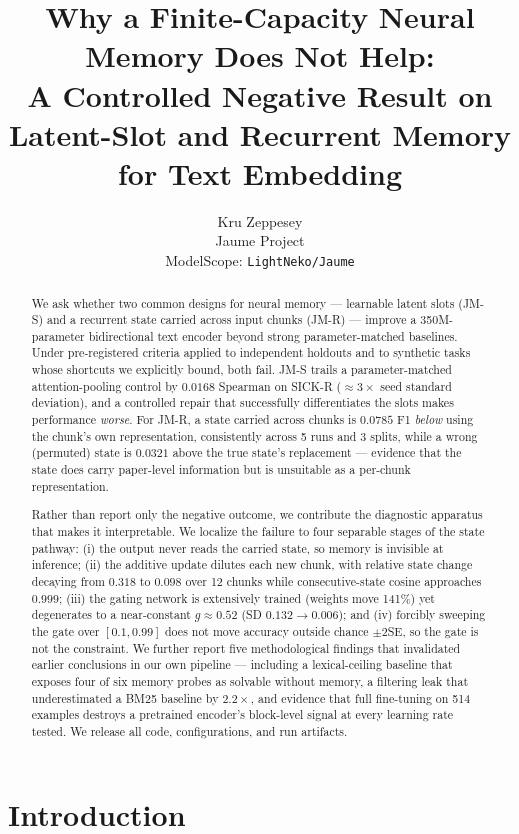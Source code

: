 \documentclass[10pt,twocolumn,letterpaper]{article}
\title{\vspace{-1.2em}Why a Finite-Capacity Neural Memory Does Not Help:\\
A Controlled Negative Result on Latent-Slot and Recurrent Memory\\for Text Embedding}
\author{Kru Zeppesey\\\small Jaume Project\\\small ModelScope: \texttt{LightNeko/Jaume}}
\date{}
\begin{document}
\maketitle

\begin{abstract}
We ask whether two common designs for neural memory --- learnable latent slots
(JM-S) and a recurrent state carried across input chunks (JM-R) --- improve a
350M-parameter bidirectional text encoder beyond strong parameter-matched
baselines. Under pre-registered criteria applied to independent holdouts and to
synthetic tasks whose shortcuts we explicitly bound, both fail. JM-S trails a
parameter-matched attention-pooling control by $0.0168$ Spearman on SICK-R
($\approx\!3\times$ seed standard deviation), and a controlled repair that
successfully differentiates the slots makes performance \emph{worse}. For JM-R,
a state carried across chunks is $0.0785$ F1 \emph{below} using the chunk's own
representation, consistently across 5 runs and 3 splits, while a wrong
(permuted) state is $0.0321$ above the true state's replacement --- evidence
that the state does carry paper-level information but is unsuitable as a
per-chunk representation.

Rather than report only the negative outcome, we contribute the diagnostic
apparatus that makes it interpretable. We localize the failure to four
separable stages of the state pathway: (i) the output never reads the carried
state, so memory is invisible at inference; (ii) the additive update dilutes
each new chunk, with relative state change decaying from $0.318$ to $0.098$
over 12 chunks while consecutive-state cosine approaches $0.999$; (iii) the
gating network is extensively trained (weights move 141\%) yet degenerates to a
near-constant $g\!\approx\!0.52$ (SD $0.132\!\to\!0.006$); and (iv) forcibly
sweeping the gate over $[0.1,0.99]$ does not move accuracy outside chance
$\pm2$SE, so the gate is not the constraint. We further report five
methodological findings that invalidated earlier conclusions in our own
pipeline --- including a lexical-ceiling baseline that exposes four of six
memory probes as solvable without memory, a filtering leak that underestimated
a BM25 baseline by $2.2\times$, and evidence that full fine-tuning on 514
examples destroys a pretrained encoder's block-level signal at every learning
rate tested. We release all code, configurations, and run artifacts.
\end{abstract}

\section{Introduction}
\end{document}
